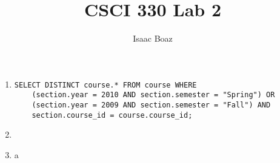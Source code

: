 \documentclass{article}
\title{CSCI 330 Lab 2}
\author{Isaac Boaz}
\begin{document}
\maketitle

\lstset{
    language=sql
}

\begin{enumerate}
    \item
          \begin{lstlisting}
SELECT DISTINCT course.* FROM course WHERE
    (section.year = 2010 AND section.semester = "Spring") OR
    (section.year = 2009 AND section.semester = "Fall") AND
    section.course_id = course.course_id;
\end{lstlisting}
    \item 
    \item a
\end{enumerate}
\end{document}
